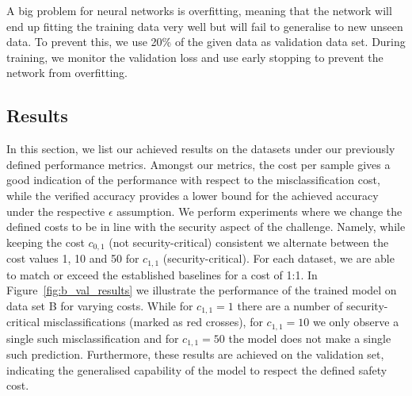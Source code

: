 \documentclass[acmsmall,nonacm]{acmart}
\begin{document}
A big problem for neural networks is overfitting, meaning that the network will end up fitting the training data very well but will fail to generalise to new unseen data. To prevent this, we use 20\% of the given data as validation data set. During training, we monitor the validation loss and use early stopping to prevent the network from overfitting. 

\subsection{Results}
In this section, we list our achieved results on the datasets under our previously defined performance metrics. Amongst our metrics, the cost per sample gives a good indication of the performance with respect to the misclassification cost, while the verified accuracy provides a lower bound for the achieved accuracy under the respective $\epsilon$ assumption. 
We perform experiments where we change the defined costs to be in line with the security aspect of the challenge. Namely, while keeping the cost $c_{0, 1}$ (not security-critical) consistent we alternate between the cost values 1, 10 and 50 for $c_{1, 1}$ (security-critical). For each dataset, we are able to match or exceed the established baselines for a cost of 1:1. In Figure~\ref{fig:b_val_results} we illustrate the performance of the trained model on data set B for varying costs. While for $c_{1, 1} = 1$ there are a number of security-critical misclassifications (marked as red crosses), for $c_{1, 1} = 10$ we only observe a single such misclassification and for $c_{1, 1} = 50$ the model does not make a single such prediction. Furthermore, these results are achieved on the validation set, indicating the generalised capability of the model to respect the defined safety cost. 
\end{document}
